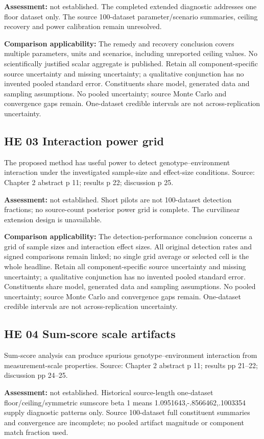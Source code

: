 \documentclass[11pt]{article}
\begin{document}
\textbf{Assessment:} not established. The completed extended diagnostic addresses one floor dataset only. The source 100-dataset parameter/scenario summaries, ceiling recovery and power calibration remain unresolved.

\textbf{Comparison applicability:} The remedy and recovery conclusion covers multiple parameters, units and scenarios, including unreported ceiling values. No scientifically justified scalar aggregate is published. Retain all component-specific source uncertainty and missing uncertainty; a qualitative conjunction has no invented pooled standard error. Constituents share model, generated data and sampling assumptions. No pooled uncertainty; source Monte Carlo and convergence gaps remain. One-dataset credible intervals are not across-replication uncertainty.
\subsection{HE 03 Interaction power grid}\label{head:HE03}
The proposed method has useful power to detect genotype--environment interaction under the investigated sample-size and effect-size conditions. Source: Chapter 2 abstract p 11; results p 22; discussion p 25.

\textbf{Assessment:} not established. Short pilots are not 100-dataset detection fractions; no source-count posterior power grid is complete. The curvilinear extension design is unavailable.

\textbf{Comparison applicability:} The detection-performance conclusion concerns a grid of sample sizes and interaction effect sizes. All original detection rates and signed comparisons remain linked; no single grid average or selected cell is the whole headline. Retain all component-specific source uncertainty and missing uncertainty; a qualitative conjunction has no invented pooled standard error. Constituents share model, generated data and sampling assumptions. No pooled uncertainty; source Monte Carlo and convergence gaps remain. One-dataset credible intervals are not across-replication uncertainty.
\subsection{HE 04 Sum-score scale artifacts}\label{head:HE04}
Sum-score analysis can produce spurious genotype--environment interaction from measurement-scale properties. Source: Chapter 2 abstract p 11; results pp 21--22; discussion pp 24--25.

\textbf{Assessment:} not established. Historical source-length one-dataset floor/ceiling/symmetric sumscore beta 1 means 1.0951643,-.8566462,.1003354 supply diagnostic patterns only. Source 100-dataset full constituent summaries and convergence are incomplete; no pooled artifact magnitude or component match fraction used.
\end{document}
